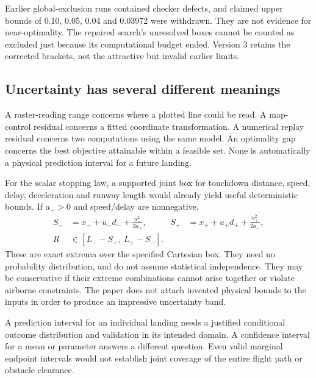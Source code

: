Earlier global-exclusion runs contained checker defects, and claimed upper bounds of 0.10, 0.05, 0.04 and 0.03972 were withdrawn. They are not evidence for near-optimality. The repaired search's unresolved boxes cannot be counted as excluded just because its computational budget ended. Version 3 retains the corrected brackets, not the attractive but invalid earlier limits.

\par\medskip
\subsection*{Uncertainty has several different meanings}
A raster-reading range concerns where a plotted line could be read. A map-control residual concerns a fitted coordinate transformation. A numerical replay residual concerns two computations using the same model. An optimality gap concerns the best objective attainable within a feasible set. None is automatically a physical prediction interval for a future landing.

For the scalar stopping law, a supported joint box for touchdown distance, speed, delay, deceleration and runway length would already yield useful deterministic bounds. If $a_->0$ and speed/delay are nonnegative,
\begin{align}
S_-&=x_-+u_-d_-+\frac{u_-^2}{2a_+}, &
S_+&=x_++u_+d_++\frac{u_+^2}{2a_-},\\
R&\in[L_- - S_+,\ L_+ - S_-].
\label{eq:box}
\end{align}
These are exact extrema over the specified Cartesian box. They need no probability distribution, and do not assume statistical independence. They may be conservative if their extreme combinations cannot arise together or violate airborne constraints. The paper does not attach invented physical bounds to the inputs in order to produce an impressive uncertainty band.

A prediction interval for an individual landing needs a justified conditional outcome distribution and validation in its intended domain. A confidence interval for a mean or parameter answers a different question. Even valid marginal endpoint intervals would not establish joint coverage of the entire flight path or obstacle clearance.

